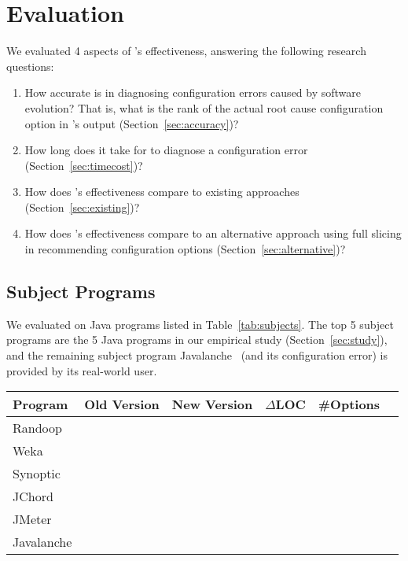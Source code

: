 
\section{Evaluation}
\label{sec:evaluation}

We evaluated 4 aspects of \ourtool's effectiveness, answering
the following research questions:

\begin{enumerate}
\item How accurate is \ourtool in diagnosing configuration errors
caused by software evolution? That is, what is the rank of the
actual root cause configuration option in \ourtool's output (Section~\ref{sec:accuracy})?

\item How long does it take for \ourtool to diagnose
a configuration error (Section~\ref{sec:timecost})?

\item How does \ourtool's effectiveness compare to
existing approaches (Section~\ref{sec:existing})?

\item How does \ourtool's effectiveness compare to
an alternative approach using full slicing in recommending
configuration options (Section~\ref{sec:alternative})?

\end{enumerate}

\subsection{Subject Programs}

We evaluated \ourtool on \subjnum Java programs
listed in Table~\ref{tab:subjects}.
The top 5 subject programs are the 5 Java programs
in our empirical study (Section~\ref{sec:study}),
and the remaining subject program Javalanche~\cite{javalanche}
(and its configuration error) is provided
by its real-world user.


\begin{table}[t]
\vspace{1mm}
\centering
\small{
\setlength{\tabcolsep}{.80\tabcolsep}
\begin{tabular}{|l||c|c|c|c|c|}
\hline
 Program & Old Version & New Version & $\Delta$LOC & \#Options \\
 \hline
 \hline
 Randoop &  &  &&   \\
 Weka &  & & &  \\
 Synoptic &  & & &  \\
 JChord &  & & &  \\
 JMeter &  & & &  \\
 Javalanche &  & & &  \\
\hline
\end{tabular}
}
\vspace{-2mm}
\end{table}

